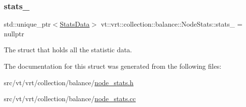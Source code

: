 \subsubsection{\texorpdfstring{stats\+\_\+}{stats\_}}
{\footnotesize\ttfamily std\+::unique\+\_\+ptr$<$\hyperlink{structvt_1_1vrt_1_1collection_1_1balance_1_1_stats_data}{Stats\+Data}$>$ vt\+::vrt\+::collection\+::balance\+::\+Node\+Stats\+::stats\+\_\+ = nullptr\hspace{0.3cm}{\ttfamily [private]}}



The struct that holds all the statistic data. 



The documentation for this struct was generated from the following files\+:\begin{DoxyCompactItemize}
\item 
src/vt/vrt/collection/balance/\hyperlink{node__stats_8h}{node\+\_\+stats.\+h}\item 
src/vt/vrt/collection/balance/\hyperlink{node__stats_8cc}{node\+\_\+stats.\+cc}\end{DoxyCompactItemize}
